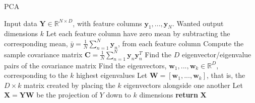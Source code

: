 \documentclass[./main.tex]{subfiles}
\begin{document}
\begin{algorithm}[htbp]
    \caption{PCA \cite{MAD_book}}
    \begin{algorithmic}[1]
        \Require Input data $\bm{Y} \in \mathbb{R}^{N \times D}$, with feature columns $\bm{y}_1, ..., \bm{y}_N$.
        \Require Wanted output dimensions $k$
        \State Let each feature column have zero mean by subtracting the corresponding mean, $\bar{y} = \frac{1}{N} \sum_{n = 1} ^N \bm{y}_n$, from each feature column
        \State Compute the sample covariance matrix $\bm{C} = \frac{1}{N} \sum_{n = 1} ^N \bm{y}_n \bm{y}_n ^T$ 
        \State Find the $D$ eigenvector/eigenvalue pairs of the covariance matrix
        \State Find the eigenvectors, $\bm{w}_1, ..., \bm{w}_k \in \mathbb{R}^D$, corresponding to the $k$ highest eigenvalues
        \State Let $\bm{W} = \left[ \bm{w}_1, ..., \bm{w}_k \right]$, that is, the $D \times k$ matrix created by placing the $k$ eigenvectors alongside one another
        \State Let $\bm{X} = \bm{Y} \bm{W}$ be the projection of $Y$ down to $k$ dimensions
        \State \textbf{return} $\bm{X}$
    \end{algorithmic}
    \label{Algorithm:PCA}
\end{algorithm}
\end{document}
